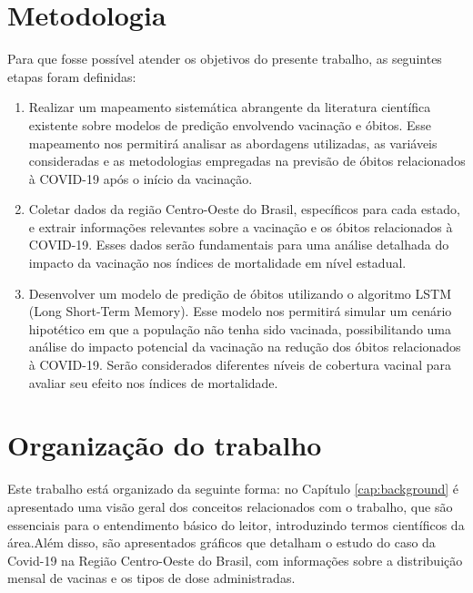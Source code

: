 \section{Metodologia}

Para que fosse possível atender os objetivos do presente trabalho, as seguintes etapas foram definidas:
\begin{enumerate}
    \item[1.]Realizar um mapeamento sistemática abrangente da literatura científica existente sobre modelos de predição envolvendo vacinação e óbitos. Esse mapeamento nos permitirá analisar as abordagens utilizadas, as variáveis consideradas e as metodologias empregadas na previsão de óbitos relacionados à COVID-19 após o início da vacinação.

    \item[2.]Coletar dados da região Centro-Oeste do Brasil, específicos para cada estado, e extrair informações relevantes sobre a vacinação e os óbitos relacionados à COVID-19. Esses dados serão fundamentais para uma análise detalhada do impacto da vacinação nos índices de mortalidade em nível estadual.

    \item[3.]Desenvolver um modelo de predição de óbitos utilizando o algoritmo LSTM (Long Short-Term Memory). Esse modelo nos permitirá simular um cenário hipotético em que a população não tenha sido vacinada, possibilitando uma análise do impacto potencial da vacinação na redução dos óbitos relacionados à COVID-19. Serão considerados diferentes níveis de cobertura vacinal para avaliar seu efeito nos índices de mortalidade.
    
\end{enumerate}

\section{Organização do trabalho}
Este trabalho está organizado da seguinte forma: no Capítulo \ref{cap:background} é apresentado uma visão geral dos conceitos relacionados com o trabalho, que são essenciais para o entendimento básico do leitor, introduzindo termos científicos da área.Além disso, são apresentados gráficos que detalham o estudo do caso da Covid-19 na Região Centro-Oeste do Brasil, com informações sobre a distribuição mensal de vacinas e os tipos de dose administradas.

